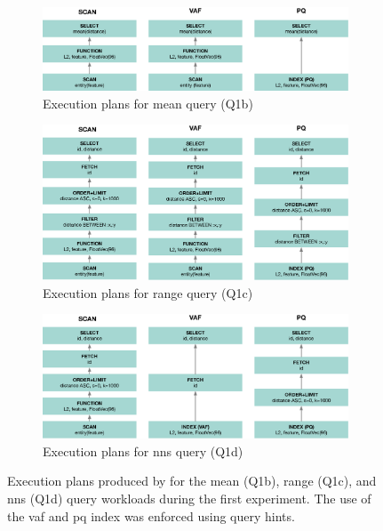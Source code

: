 \begin{figure}[p]
    \centering
    \begin{subfigure}[b]{\textwidth}
        \centering
        \includegraphics[width=\textwidth]{figures/analytics/query-plan-mean}
        \caption{Execution plans for mean query (Q1b)}
        \label{figure:cottontail_analytics_mean}
    \end{subfigure}
    \hfill
    \centering
    \begin{subfigure}[b]{\textwidth}
        \centering
        \includegraphics[width=\textwidth]{figures/analytics/query-plan-range}
        \caption{Execution plans for range query (Q1c)}
        \label{figure:cottontail_analytics_range}
    \end{subfigure}
    \hfill
    \centering
    \begin{subfigure}[b]{\textwidth}
        \centering
        \includegraphics[width=\textwidth]{figures/analytics/query-plan-nns}
        \caption{Execution plans for \acrshort{nns} query (Q1d)}
        \label{figure:cottontail_analytics_nns}
    \end{subfigure}
    \caption{Execution plans produced by \cottontail{} for the mean (Q1b), range (Q1c), and \acrshort{nns} (Q1d) query workloads during the first experiment. The use of the \acrshort{vaf} and \acrshort{pq} index was enforced using query hints.}
    \label{figure:cottontail_analytics_plans}
\end{figure}

